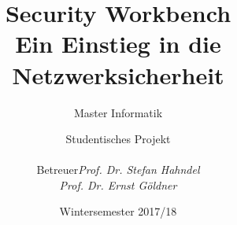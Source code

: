 

\title{Security Workbench\\ Ein Einstieg in die Netzwerksicherheit}
\subtitle{Master Informatik}
\subject{DOKUMENTATION}

\author{Studentisches Projekt \\[0.5cm]
\begin{tabular}{rl}
Betreuer & \emph{Prof. Dr. Stefan Hahndel}\\
 & \emph{Prof. Dr. Ernst Göldner}
\end{tabular}
}

\date{Wintersemester 2017/18}



\tableofcontents
\clearpage
\listoffigures
\clearpage
















